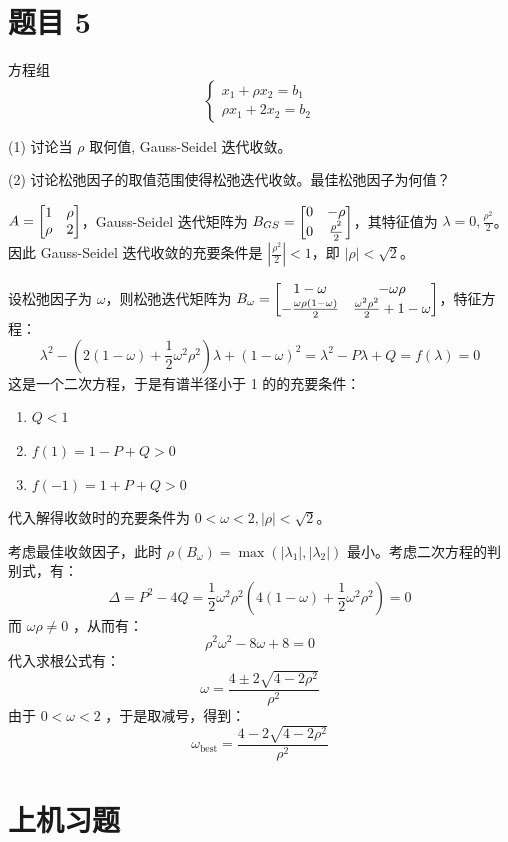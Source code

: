 \documentclass{article}
\begin{document}
\section{题目 5}

方程组
\begin{equation}
  \begin{cases}
    x_1 + \rho x_2 = b_1 \\
    \rho x_1 + 2 x_2 = b_2
  \end{cases}
\end{equation}

(1) 讨论当 $\rho$ 取何值, Gauss-Seidel 迭代收敛。

(2) 讨论松弛因子的取值范围使得松弛迭代收敛。最佳松弛因子为何值？

\begin{solution}
  $A = \begin{bmatrix} 1 & \rho \\ \rho & 2 \end{bmatrix}$，Gauss-Seidel 迭代矩阵为 $B_{GS} =
  \begin{bmatrix} 0 & -\rho \\ 0 & \frac{\rho^2}{2} \end{bmatrix}$，其特征值为 $\lambda = 0,
  \frac{\rho^2}{2}$。因此
  Gauss-Seidel 迭代收敛的充要条件是 $|\frac{\rho^2}{2}| < 1$，即 $|\rho| < \sqrt{2}$。

  设松弛因子为 $\omega$，则松弛迭代矩阵为 $B_{\omega}
  =\begin{bmatrix} 1-\omega & -\omega \rho \\ -\frac{\omega \rho
  (1-\omega)}{2} & \frac{\omega^2\rho^2}{2} + 1 - \omega \end{bmatrix}$，特征方程：
  \[
    \lambda^2 - (2(1-\omega)+ \frac{1}{2}\omega^2 \rho^2)\lambda +
    (1-\omega)^2 = \lambda^2 - P \lambda + Q = f(\lambda)= 0
  \]
  这是一个二次方程，于是有谱半径小于 1 的的充要条件：
  \begin{enumerate}
    \item $Q < 1$
    \item $f(1) = 1-P+Q > 0$
    \item $f(-1) = 1+P+Q > 0$
  \end{enumerate}
  代入解得收敛时的充要条件为 $0 < \omega < 2, |\rho| < \sqrt{2}$。

  考虑最佳收敛因子，此时 $\rho(B_{\omega}) = \max(|\lambda_1|, |\lambda_2|)$
  最小。考虑二次方程的判别式，有：
  \[
    \Delta = P^2 - 4Q = \frac{1}{2}\omega^2 \rho^2 \left(4(1-\omega)
    + \frac{1}{2}\omega^2\rho^2\right) = 0
  \]
  而 $\omega\rho \ne 0$ ，从而有：
  \[
    \rho^2 \omega^2 - 8\omega + 8 = 0
  \]
  代入求根公式有：
  \[
    \omega = \frac{4 \pm 2\sqrt{4-2\rho^2}}{\rho^2}
  \]
  由于 $0 < \omega < 2$ ，于是取减号，得到：
  \[
    \omega_{\text{best}} = \frac{4-2\sqrt{4-2\rho^2}}{\rho^2}
  \]
\end{solution}

\section{上机习题}
\end{document}
